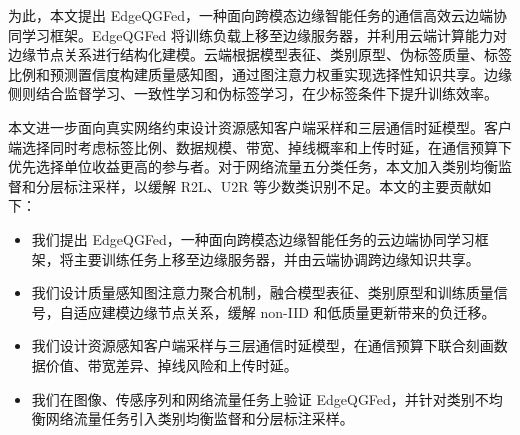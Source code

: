 \documentclass[journal]{IEEEtran}
\begin{document}
为此，本文提出 EdgeQGFed，一种面向跨模态边缘智能任务的通信高效云边端协同学习框架。EdgeQGFed 将训练负载上移至边缘服务器，并利用云端计算能力对边缘节点关系进行结构化建模。云端根据模型表征、类别原型、伪标签质量、标签比例和预测置信度构建质量感知图，通过图注意力权重实现选择性知识共享。边缘侧则结合监督学习、一致性学习和伪标签学习，在少标签条件下提升训练效率。

本文进一步面向真实网络约束设计资源感知客户端采样和三层通信时延模型。客户端选择同时考虑标签比例、数据规模、带宽、掉线概率和上传时延，在通信预算下优先选择单位收益更高的参与者。对于网络流量五分类任务，本文加入类别均衡监督和分层标注采样，以缓解 R2L、U2R 等少数类识别不足。本文的主要贡献如下：

\begin{itemize}
\item [1.] 我们提出 EdgeQGFed，一种面向跨模态边缘智能任务的云边端协同学习框架，将主要训练任务上移至边缘服务器，并由云端协调跨边缘知识共享。
\item [2.] 我们设计质量感知图注意力聚合机制，融合模型表征、类别原型和训练质量信号，自适应建模边缘节点关系，缓解 non-IID 和低质量更新带来的负迁移。
\item [3.] 我们设计资源感知客户端采样与三层通信时延模型，在通信预算下联合刻画数据价值、带宽差异、掉线风险和上传时延。
\item [4.] 我们在图像、传感序列和网络流量任务上验证 EdgeQGFed，并针对类别不均衡网络流量任务引入类别均衡监督和分层标注采样。
\end{itemize}
\end{document}
